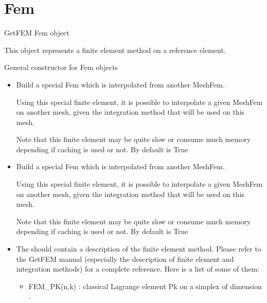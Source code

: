 \documentclass[a4paper,11pt,english]{sphinxmanual}
\begin{document}
\section{Fem}
\label{\detokenize{python/cmdref_Fem:fem}}\label{\detokenize{python/cmdref_Fem::doc}}

\begin{fulllineitems}
\label{\detokenize{python/cmdref_Fem:getfem.Fem}}
GetFEM Fem object

This object represents a finite element method on a reference element.

General constructor for Fem objects
\begin{itemize}
\item {} 
Build a special Fem which is interpolated from another MeshFem.

Using this special finite element, it is possible to interpolate a given
MeshFem  on another mesh, given the integration method 
that will be used on this mesh.

Note that this finite element may be quite slow or consume much
memory depending if caching is used or not. By default  is
True

\item {} 
Build a special Fem which is interpolated from another MeshFem.

Using this special finite element, it is possible to interpolate a given
MeshFem  on another mesh, given the integration method 
that will be used on this mesh.

Note that this finite element may be quite slow or consume much
memory depending if caching is used or not. By default  is
True

\item {} 
The  should contain a description of the finite element
method. Please refer to the GetFEM manual (especially the
description of finite element and integration methods) for a complete
reference. Here is a list of some of them:
\begin{itemize}
\item {} 
FEM\_PK(n,k) :
classical Lagrange element Pk on a simplex of dimension .


\end{itemize}
\end{itemize}
\end{fulllineitems}
\end{document}
